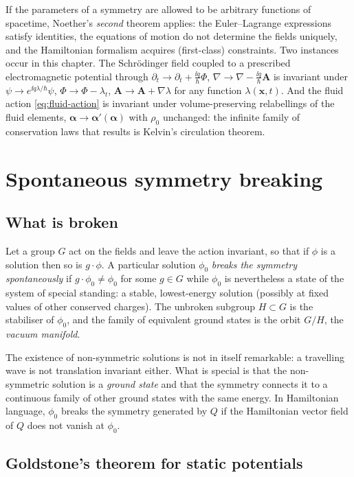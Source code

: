 If the parameters of a symmetry are allowed to be arbitrary functions of
spacetime, Noether's \emph{second} theorem applies: the Euler--Lagrange
expressions satisfy identities, the equations of motion do not determine the
fields uniquely, and the Hamiltonian formalism acquires (first-class) constraints.
Two instances occur in this chapter. The Schr\"odinger field coupled to a prescribed
electromagnetic potential through $\partial_t\to\partial_t+\tfrac{\ii q}{\hbar}\Phi$,
$\nabla\to\nabla-\tfrac{\ii q}{\hbar}\mathbf{A}$ is invariant under
$\psi\to e^{\ii q\lambda/\hbar}\psi$, $\Phi\to\Phi-\lambda_t$,
$\mathbf{A}\to\mathbf{A}+\nabla\lambda$ for any function $\lambda(\mathbf{x},t)$. And
the fluid action \eqref{eq:fluid-action} is invariant under volume-preserving
relabellings of the fluid elements, $\boldsymbol\alpha\to\boldsymbol\alpha'(\boldsymbol\alpha)$
with $\rho_0$ unchanged: the infinite family of conservation laws that results is
Kelvin's circulation theorem.

\section{Spontaneous symmetry breaking}
\label{sec:ssb}

\subsection{What is broken}

Let a group $G$ act on the fields and leave the action invariant, so that
if $\phi$ is a solution then so is $g\cdot\phi$. A particular solution $\phi_0$
\emph{breaks the symmetry spontaneously} if $g\cdot\phi_0\neq\phi_0$ for some
$g\in G$ while $\phi_0$ is nevertheless a state of the system of special standing:
a stable, lowest-energy solution (possibly at fixed values of other conserved
charges). The unbroken subgroup $H\subset G$ is the stabiliser of $\phi_0$, and the
family of equivalent ground states is the orbit $G/H$, the \emph{vacuum manifold}.

The existence of non-symmetric solutions is not in itself remarkable: a travelling
wave is not translation invariant either. What is special is that the
non-symmetric solution is a \emph{ground state} and that the symmetry connects it
to a continuous family of other ground states with the same energy. In
Hamiltonian language, $\phi_0$ breaks the symmetry generated by $Q$ if the
Hamiltonian vector field of $Q$ does not vanish at $\phi_0$.

\subsection{Goldstone's theorem for static potentials}

